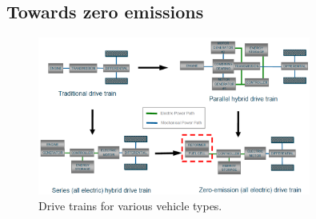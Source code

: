 \subsection{Towards zero emissions}
\begin{figure}[H]
    \centering
    \includegraphics[width = 0.8\textwidth]{img/figure96.png}
    \caption{Drive trains for various vehicle types.}
\end{figure}
